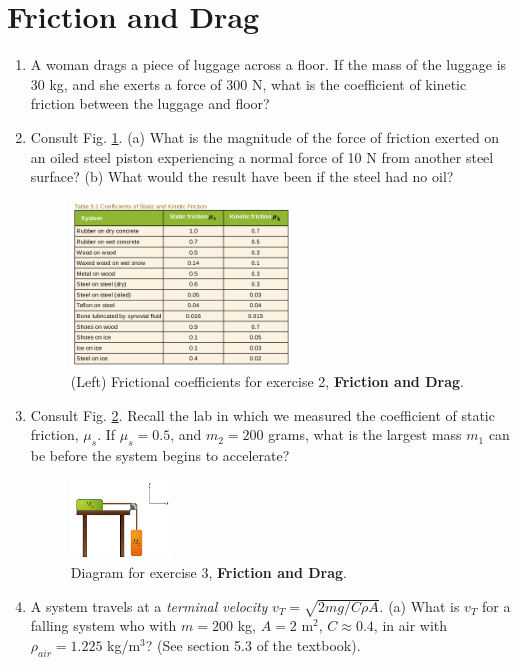 \documentclass[10pt]{article}
\begin{document}
\section{Friction and Drag}
\small
\begin{enumerate}
\item A woman drags a piece of luggage across a floor.  If the mass of the luggage is 30 kg, and she exerts a force of 300 N, what is the coefficient of kinetic friction between the luggage and floor? \\ \vspace{1.5cm}
\item Consult Fig. \ref{fig:coeff}. (a) What is the magnitude of the force of friction exerted on an oiled steel piston experiencing a normal force of 10 N from another steel surface? (b) What would the result have been if the steel had no oil? \\ \vspace{1.5cm}
\begin{figure}
\centering
\includegraphics[width=0.55\textwidth]{figures/coefficients.png}
\caption{\label{fig:coeff} (Left) Frictional coefficients for exercise 2, \textbf{Friction and Drag}.}
\end{figure}
\item Consult Fig. \ref{fig:blocks}.  Recall the lab in which we measured the coefficient of static friction, $\mu_s$.  If $\mu_s = 0.5$, and $m_2=200$ grams, what is the largest mass $m_1$ can be before the system begins to accelerate? \vspace{1cm}
\begin{figure}[hb]
\centering
\includegraphics[width=0.25\textwidth]{figures/table.png}
\caption{\label{fig:blocks} Diagram for exercise 3, \textbf{Friction and Drag}.}
\end{figure}
\item A system travels at a \textit{terminal velocity} $v_{T} = \sqrt{2mg/C\rho A}$.  (a) What is $v_{T}$ for a falling system who with $m=200$ kg, $A=2$ m$^2$, $C \approx 0.4$, in air with $\rho_{air}=1.225$ kg/m$^3$? (See section 5.3 of the textbook).
\end{enumerate}
\end{document}
